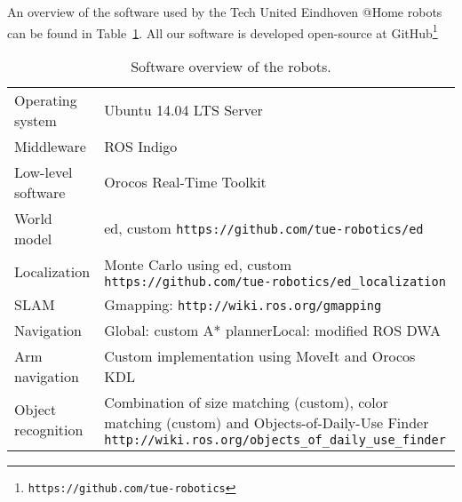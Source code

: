 An overview of the software used by the Tech United Eindhoven @Home robots can be found in Table~\ref{tab:softwarespec}.
All our software is developed open-source at GitHub\footnote{\texttt{https://github.com/tue-robotics}}

\begin{table}[H]
    \begin{center}
    \caption{Software overview of the robots.}
    \label{tab:softwarespec}
    \vspace{-0.25cm}
    \renewcommand{\arraystretch}{1.0}
    \setlength{\tabcolsep}{5pt}
        \begin{tabular}{p{} p{}}
        	\toprule
            Operating system & Ubuntu 14.04 LTS Server\\
            
            Middleware & ROS Indigo\\
            
            Low-level software & Orocos Real-Time Toolkit\\
            
            World model & \acrfull{ed}, custom \newline \texttt{https://github.com/tue-robotics/ed}\\
            
            Localization & Monte Carlo using \gls{ed}, custom \newline \texttt{https://github.com/tue-robotics/ed\_localization}\\
            
            SLAM & Gmapping: \texttt{http://wiki.ros.org/gmapping}\\
            
            Navigation & Global: custom A* planner\newline Local: modified ROS DWA\\
            
            Arm navigation & Custom implementation using MoveIt and Orocos KDL\\
            
            Object recognition & Combination of size matching (custom), color matching (custom) and Objects-of-Daily-Use Finder \newline \texttt{http://wiki.ros.org/objects\_of\_daily\_use\_finder} \\
            

\end{tabular}
\end{center}
\end{table}
